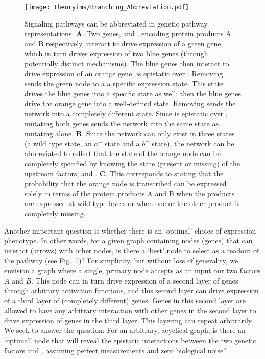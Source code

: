 \begin{figure}
  \texttt{[image: theoryims/Branching\_Abbreviation.pdf]}
  \caption{Signaling pathways can be abbreviated in genetic pathway
           representations.
           \textbf{A}. Two genes,  and ,
           encoding protein products A and B respectively, interact to drive
           expression of a green gene, which in turn drives expression of two
           blue genes (through potentially distinct mechanisms). The blue genes
           then interact to drive expression of an orange gene.  is
           epistatic over . Removing  sends the green node to a
           a specific expression state. This state drives the blue genes into
           a specific state as well; then the blue genes drive the orange gene
           into a well-defined state. Removing  sends the network into a
           completely different state. Since  is epistatic over
           , mutating both genes sends the network into the same state
           as mutating  alone.
           \textbf{B}. Since the network can only exist in three states (a
           wild type state, an \(a^-\) state and a \(b^-\) state), the network
           can be abbreviated to reflect that the state of the orange node can
           be completely specified by knowing the state (present or missing) of
           the upstream factors,  and . \textbf{C}. This
           corresponds to stating that the probability that the orange node is
           transcribed can be expressed solely in terms of the protein products
           A and B when the products are expressed at wild-type levels or when
           one or the other product is completely missing.
           }\label{fig:branch}
\end{figure}

Another important question is whether there is an `optimal' choice of expression
phenotype. In other words, for a given graph containing nodes (genes) that can
interact (arrows) with other nodes, is there a `best' node to select as a
readout of the pathway (see Fig.~\ref{fig:branch})? For simplicity, but without
loss of generality, we envision a graph where a single, primary node accepts as
an input our two factors \(A\) and \(B\). This node can in turn drive expression of
a second layer of genes through arbitrary activation functions, and this second
layer can drive expression of a third layer of (completely different) genes.
Genes in this second layer are allowed to have any arbitrary interaction with
other genes in the second layer to drive expression of genes in the third layer.
This layering can repeat arbitrarily. We seek to answer the question: For an
arbitrary, acyclical graph, is there an `optimal' node that will reveal the
epistatic interactions between the two genetic factors  and ,
assuming perfect measurements and zero biological noise?

